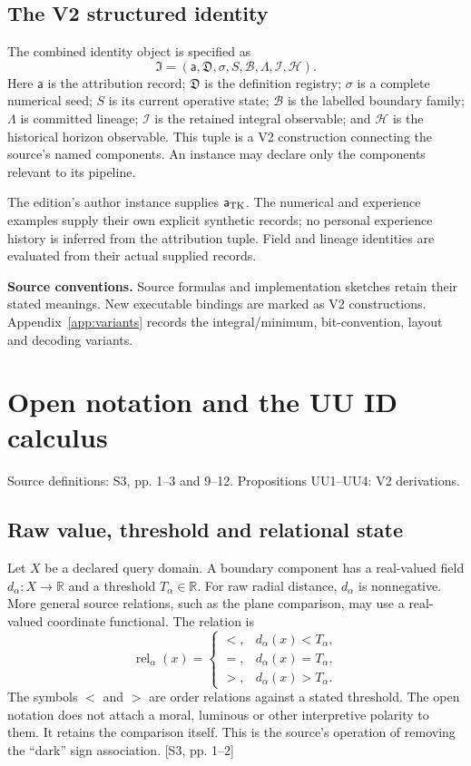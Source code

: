 \documentclass[11pt,a4paper]{article}
\numberwithin{equation}{section}
\newcommand{\newsec}[1]{\clearpage\section{#1}}
\newcommand{\src}[2]{{\sffamily\small\color{slate}[#1, #2]}}
\newcommand{\origin}[1]{{\sffamily\small\color{slate}#1}\par\vspace{3pt}}
\begin{document}
\subsection{The V2 structured identity}
The combined identity object is specified as
\begin{equation}
\mathfrak I=(\mathsf a,\mathfrak D,\sigma,S,\mathcal B,\Lambda,\mathcal I,\mathcal H).
\label{eq:identity-object}
\end{equation}
Here $\mathsf a$ is the attribution record; $\mathfrak D$ is the definition registry; $\sigma$ is a complete numerical seed; $S$ is its current operative state; $\mathcal B$ is the labelled boundary family; $\Lambda$ is committed lineage; $\mathcal I$ is the retained integral observable; and $\mathcal H$ is the historical horizon observable. This tuple is a V2 construction connecting the source's named components. An instance may declare only the components relevant to its pipeline.

The edition's author instance supplies $\mathsf a_{\rm TK}$. The numerical and experience examples supply their own explicit synthetic records; no personal experience history is inferred from the attribution tuple. Field and lineage identities are evaluated from their actual supplied records.

\textbf{Source conventions.} Source formulas and implementation sketches retain their stated meanings. New executable bindings are marked as V2 constructions. Appendix~\ref{app:variants} records the integral/minimum, bit-convention, layout and decoding variants.

\newsec{Open notation and the UU ID calculus}
\label{sec:uuid}
\origin{Source definitions: S3, pp. 1--3 and 9--12. Propositions UU1--UU4: V2 derivations.}

\subsection{Raw value, threshold and relational state}
Let $X$ be a declared query domain. A boundary component has a real-valued field $d_\alpha:X\to\mathbb R$ and a threshold $T_\alpha\in\mathbb R$. For raw radial distance, $d_\alpha$ is nonnegative. More general source relations, such as the plane comparison, may use a real-valued coordinate functional. The relation is
\begin{equation}
\operatorname{rel}_\alpha(x)=
\begin{cases}
<,&d_\alpha(x)<T_\alpha,\\
=,&d_\alpha(x)=T_\alpha,\\
>,&d_\alpha(x)>T_\alpha.
\end{cases}
\end{equation}
The symbols $<$ and $>$ are order relations against a stated threshold. The open notation does not attach a moral, luminous or other interpretive polarity to them. It retains the comparison itself. This is the source's operation of removing the ``dark'' sign association. \src{S3}{pp. 1--2}
\end{document}
